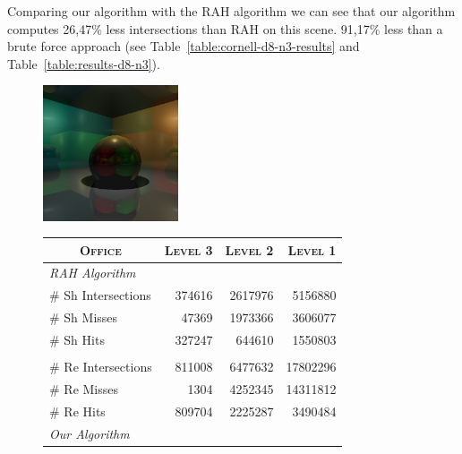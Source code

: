 
Comparing our algorithm with the RAH algorithm we can see that our algorithm computes 26,47\% less intersections than RAH on this scene. 91,17\% less than a brute force approach (see Table~\ref{table:cornell-d8-n3-results} and Table~\ref{table:results-d8-n3}).


\begin{figure}[!htb]
    \begin{minipage}{0.25\linewidth}
        \centering
        \includegraphics[width=4.0cm]{Images/Cornell_Preview}
    \end{minipage}
    \begin{minipage}{0.725\linewidth}
        \centering
        \fontsize{8}{10}
        \selectfont
        \begin{tabular}[h]{l|rrr}
            \multicolumn{1}{c|}{\textsc{Office}} & \textsc{Level 3} & \textsc{Level 2} & \textsc{Level 1}\\
            \hline
            \emph{RAH Algorithm} & & \\
            \hline
            \quad \# Sh Intersections   & 374616 & 2617976 & 5156880    \\
            \quad \# Sh Misses             & 47369	 & 1973366 & 3606077    \\
            \quad \# Sh Hits               & 327247 & 644610  & 1550803    \\
            & & \\
            \quad \# Re Intersections   & 811008 & 6477632 & 17802296   \\
            \quad \# Re Misses             & 1304	 & 4252345 & 14311812   \\
            \quad \# Re Hits               & 809704 & 2225287 & 3490484    \\
            \hline
            \emph{Our Algorithm} & & \\
            \hline

\end{tabular}
\end{minipage}
\end{figure}
